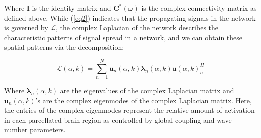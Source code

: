 \documentclass{article}
\begin{document}
Where $\pmb{I}$ is the identity matrix and $\pmb{C}^{*}(\omega)$ is the complex connectivity matrix as defined above. While (\ref{eq2}) indicates that the propagating signals in the network is governed by $\mathcal{L}$, the complex Laplacian of the network describes the characteristic patterns of signal spread in a network, and we can obtain these spatial patterns via the decomposition:

\begin{equation}
\label{eq4}
\bm{\mathcal{L}}(\alpha, k) = \sum_{n = 1}^{N} \bm{u}_{n}(\alpha, k)\bm{\lambda}_{n}(\alpha, k)\bm{u}(\alpha, k)_{n}^{H}
\end{equation}

Where $\bm{\lambda}_{n}(\alpha, k)$ are the eigenvalues of the complex Laplacian matrix and $\bm{u}_{n}(\alpha, k)$'s are the complex eigenmodes of the complex Laplacian matrix. Here, the entries of the complex eigenmodes represent the relative amount of activation in each parcellated brain region as controlled by global coupling and wave number parameters.
\end{document}
